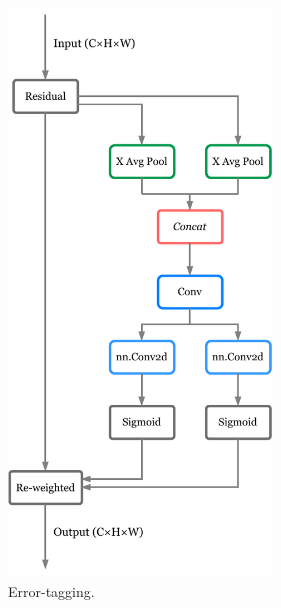 \documentclass[sensors,article,submit,moreauthors]{Definitions/mdpi}
\begin{document}
    \begin{figure}[H]
        \includegraphics[width=7cm]{images/figure3}
        \caption{Error-tagging.\label{fig:3}}
    \end{figure}
\end{document}

